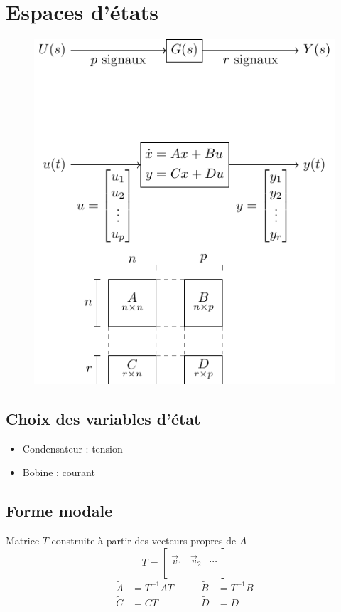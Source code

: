 \documentclass[resume]{subfiles}
\begin{document}
\section{Espaces d'états}
\begin{figure}[H]
\centering
\includegraphics[scale=1,page=1]{drwg_0.pdf}
\end{figure}
\subsection{Choix des variables d'état}
\begin{itemize}
\item Condensateur : tension
\item Bobine : courant
\end{itemize}

\subsection{Forme modale}
Matrice $T$ construite à partir des vecteurs propres de $A$
$$T=\begin{bmatrix}
\\
\vec{v}_1 & \vec{v}_2 & \cdots\\
\\
\end{bmatrix}$$
$$\boxed{\begin{split}
\tilde{A} &= T^{-1}AT &\qquad \tilde{B}&=T^{-1}B\\
\tilde{C} &= CT&\qquad \tilde{D}&=D\end{split}}$$
\end{document}
